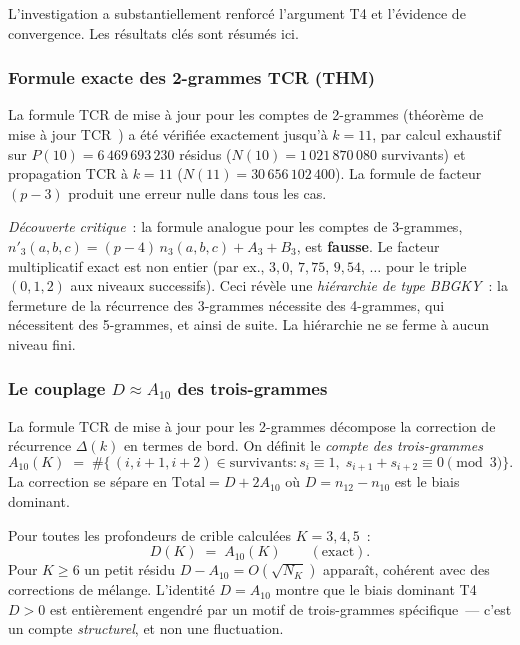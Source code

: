 \documentclass[12pt,a4paper]{article}
\begin{document}
L'investigation a substantiellement renforcé l'argument T4 et
l'évidence de convergence. Les résultats clés sont résumés ici.

\subsubsection{Formule exacte des 2-grammes TCR (THM)}

La formule TCR de mise à jour pour les comptes de 2-grammes (théorème
de mise à jour TCR~\cite{companion_M1}) a été vérifiée exactement
jusqu'à $k = 11$, par calcul exhaustif sur
$P(10) = 6\,469\,693\,230$ résidus
($N(10) = 1\,021\,870\,080$ survivants) et propagation TCR à
$k = 11$ ($N(11) = 30\,656\,102\,400$).
La formule de facteur $(p-3)$ produit une erreur nulle dans tous les
cas.

\emph{Découverte critique}~: la formule analogue pour les comptes de
3-grammes, $n'_3(a,b,c) = (p-4)\,n_3(a,b,c) + A_3 + B_3$, est
\textbf{fausse}. Le facteur multiplicatif exact est non entier
(par ex., $3{,}0$, $7{,}75$, $9{,}54$, $\ldots$ pour le triple
$(0,1,2)$ aux niveaux successifs). Ceci révèle une \emph{hiérarchie
de type BBGKY}~: la fermeture de la récurrence des 3-grammes
nécessite des 4-grammes, qui nécessitent des 5-grammes, et ainsi de
suite. La hiérarchie ne se ferme à aucun niveau fini.

\subsubsection{Le couplage $D \approx A_{10}$ des trois-grammes}
\label{sec:ch7b_DA10}

La formule TCR de mise à jour pour les 2-grammes décompose la
correction de récurrence $\Delta(k)$ en termes de bord. On définit
le \emph{compte des trois-grammes}
\begin{equation}
  A_{10}(K) \;=\; \#\bigl\{\,(i,i{+}1,i{+}2) \in \text{survivants}
  : s_i \equiv 1,\; s_{i+1}+s_{i+2} \equiv 0 \pmod{3}\bigr\}.
  \label{eq:A10_def_ext}
\end{equation}
La correction se sépare en
$\mathrm{Total} = D + 2A_{10}$
où $D = n_{12}-n_{10}$ est le biais dominant.

\begin{proposition}[Quasi-identité $D = A_{10}$]
\label{prop:DA10_ext}
Pour toutes les profondeurs de crible calculées $K = 3,4,5$~:
\[
  D(K) \;=\; A_{10}(K) \qquad (\text{exact}).
\]
Pour $K \geq 6$ un petit résidu $D - A_{10} = O(\sqrt{N_K})$
apparaît, cohérent avec des corrections de mélange.
L'identité $D = A_{10}$ montre que le biais dominant T4 $D > 0$ est
entièrement engendré par un motif de trois-grammes spécifique~--- c'est
un compte \emph{structurel}, et non une fluctuation.
\end{proposition}
\end{document}
